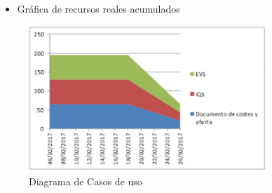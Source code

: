 \begin{itemize}
\item Gráfica de recursos reales acumulados
\end{itemize}

\begin{figure}[H]
\begin{center}
\includegraphics[width=0.8\textwidth]{./img/RecursosReales.png}
\end{center}
\caption{Diagrama de Casos de uso}
\label{tab:dcufinal}
\end{figure}
